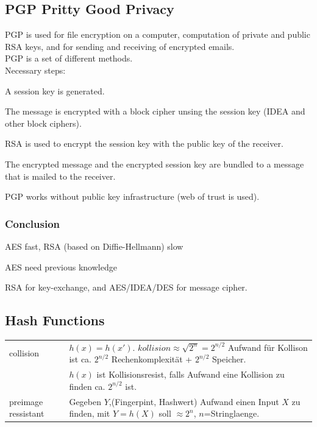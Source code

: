 \subsection{PGP Pritty Good Privacy}
PGP is used for file encryption on a computer, computation of private and public RSA keys, and for sending and receiving of encrypted emails.\\
PGP is a set of different methods.\\
Necessary steps:
\begin{aufzaehlung}
\item A session key is generated.
\item The message is encrypted with a block cipher unsing the session key (IDEA and other block ciphers).
\item RSA is used to encrypt the session key with the public key of the receiver.
\item The encrypted message and the encrypted session key are bundled to a message that is mailed to the receiver.\\
\end{aufzaehlung}
PGP works without public key infrastructure (web of trust is used).

\subsubsection{Conclusion}
\begin{liste}
\item AES fast, RSA (based on Diffie-Hellmann) slow
\item AES need previous knowledge 
\item RSA for key-exchange, and AES/IDEA/DES for message cipher.
\end{liste}

\subsection{Hash Functions}
\begin{tabular}{l p{13cm}}
	collision				&	$h(x)=h(x')$. $kollision \approx \sqrt{2^n}=2^{n/2}$ Aufwand f\"ur Kollison ist ca. $2^{n/2}$ Rechenkomplexit\"at +
								$2^{n/2}$ Speicher. \\
							&	$h(x)$ ist Kollisionsresist, falls Aufwand eine Kollision zu finden ca. $2^{n/2}$ ist.\\
	preimage ressistant		&	Gegeben $Y$,(Fingerpint, Hashwert) Aufwand einen Input $X$ zu finden, 
								mit $Y=h(X)$ soll $\approx2^n$, $n$=Stringlaenge.\\

\end{tabular}

